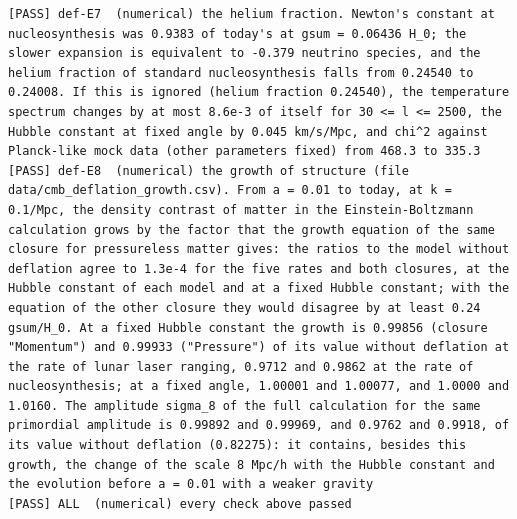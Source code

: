 \documentclass[
  10pt,
]{article}
\begin{document}
\begin{verbatim}
[PASS] def-E7  (numerical) the helium fraction. Newton's constant at nucleosynthesis was 0.9383 of today's at gsum = 0.06436 H_0; the slower expansion is equivalent to -0.379 neutrino species, and the helium fraction of standard nucleosynthesis falls from 0.24540 to 0.24008. If this is ignored (helium fraction 0.24540), the temperature spectrum changes by at most 8.6e-3 of itself for 30 <= l <= 2500, the Hubble constant at fixed angle by 0.045 km/s/Mpc, and chi^2 against Planck-like mock data (other parameters fixed) from 468.3 to 335.3
[PASS] def-E8  (numerical) the growth of structure (file data/cmb_deflation_growth.csv). From a = 0.01 to today, at k = 0.1/Mpc, the density contrast of matter in the Einstein-Boltzmann calculation grows by the factor that the growth equation of the same closure for pressureless matter gives: the ratios to the model without deflation agree to 1.3e-4 for the five rates and both closures, at the Hubble constant of each model and at a fixed Hubble constant; with the equation of the other closure they would disagree by at least 0.24 gsum/H_0. At a fixed Hubble constant the growth is 0.99856 (closure "Momentum") and 0.99933 ("Pressure") of its value without deflation at the rate of lunar laser ranging, 0.9712 and 0.9862 at the rate of nucleosynthesis; at a fixed angle, 1.00001 and 1.00077, and 1.0000 and 1.0160. The amplitude sigma_8 of the full calculation for the same primordial amplitude is 0.99892 and 0.99969, and 0.9762 and 0.9918, of its value without deflation (0.82275): it contains, besides this growth, the change of the scale 8 Mpc/h with the Hubble constant and the evolution before a = 0.01 with a weaker gravity
[PASS] ALL  (numerical) every check above passed
\end{verbatim}
\end{document}
